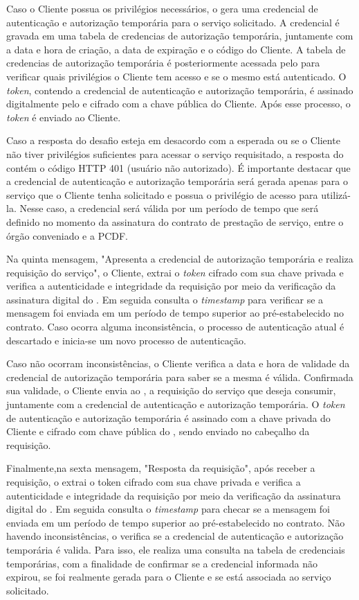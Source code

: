 Caso o Cliente possua os privilégios necessários, o \servidorAA{} gera uma credencial de autenticação e autorização temporária para o serviço solicitado. A credencial é gravada em uma tabela de credencias de autorização temporária, juntamente com a data e hora de criação, a data de expiração e o código do Cliente. A tabela de credencias de autorização temporária é posteriormente acessada pelo \servidorRest{} para verificar quais privilégios o Cliente tem acesso e se o mesmo está autenticado. O \emph{token}, contendo a credencial de autenticação e autorização temporária, é  assinado digitalmente pelo \servidorAA{} e cifrado  com a chave pública do Cliente. Após esse processo, o \emph{token} é enviado ao Cliente.

Caso a resposta do desafio esteja em desacordo com a esperada ou se o Cliente não tiver privilégios suficientes para acessar o serviço requisitado, a resposta do \servidorAA{} contém o código HTTP 401 (usuário não autorizado).
É importante destacar que a credencial de autenticação e autorização temporária será gerada apenas para o serviço que o Cliente tenha solicitado e possua o privilégio de acesso para utilizá-la. Nesse caso, a credencial será válida por um período  de tempo que será definido no momento da assinatura do contrato de prestação de serviço,
entre o órgão conveniado e a PCDF.

Na quinta mensagem, "Apresenta a credencial de autorização temporária e realiza requisição do serviço", o Cliente, extrai o \emph{token} cifrado com sua chave privada e verifica a autenticidade e integridade da requisição por meio da verificação da assinatura digital do \servidorAA. Em seguida consulta o \emph{timestamp} para verificar se a mensagem foi enviada em um período de tempo superior ao pré-estabelecido no contrato. Caso ocorra alguma inconsistência, o processo de autenticação atual é descartado e inicia-se um novo processo de autenticação.

Caso não ocorram inconsistências, o Cliente verifica a data e hora de validade da credencial de autorização temporária para saber se a mesma é válida. Confirmada sua validade, o Cliente envia ao \servidorRest, a requisição do serviço que deseja consumir, juntamente com a credencial de autenticação e autorização temporária. O \emph{token} de autenticação e autorização temporária é assinado com a chave privada do Cliente e cifrado com chave pública do \servidorRest, sendo enviado no cabeçalho da requisição.

Finalmente,na sexta mensagem, "Resposta da requisição", após receber a requisição, o \servidorRest{} extrai o token cifrado com sua chave privada e verifica a autenticidade e integridade da requisição por meio da verificação da assinatura digital do \servidorAA. Em seguida consulta o \emph{timestamp} para checar se a mensagem foi enviada em um período de tempo superior ao pré-estabelecido no contrato. Não havendo inconsistências, o \servidorRest{}verifica se a credencial de autenticação e autorização temporária é valida. Para isso, ele realiza uma consulta na tabela de credenciais temporárias, com a finalidade de confirmar se a credencial informada não expirou, se  foi realmente gerada para o Cliente e se está associada ao serviço solicitado.

